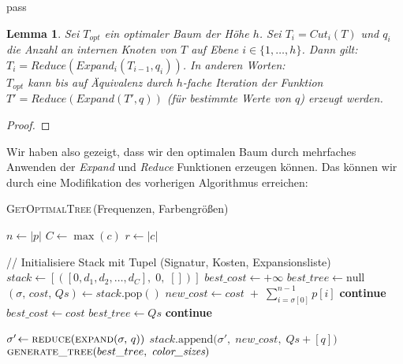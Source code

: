 pass\documentclass[a4paper,10pt,ngerman]{scrartcl}
\newtheorem{lemma}[satz]{Lemma}
\begin{document}
    \begin{lemma}
        Sei $T_{opt}$ ein optimaler Baum der Höhe $h$.
        Sei $T_i = Cut_i(T)$ und $q_i$ die Anzahl an internen Knoten von $T$ auf Ebene $i \in \{1, \dots, h\}$.
        Dann gilt: $T_i = Reduce(Expand_i(T_{i-1}, q_i))$.
        In anderen Worten: \\
        $T_{opt}$ kann bis auf Äquivalenz durch $h$-fache Iteration der Funktion $T' = Reduce(Expand(T',q))$ (für bestimmte Werte von $q$) erzeugt werden.
    \end{lemma}
    \begin{proof}

    \end{proof}
    Wir haben also gezeigt, dass wir den optimalen Baum durch mehrfaches Anwenden der \textit{Expand} und \textit{Reduce} Funktionen erzeugen können.
    Das können wir durch eine Modifikation des vorherigen Algorithmus erreichen:
    \begin{algorithm} [H]
        \caption{\textsc{GetOptimalTree}\,(Frequenzen, Farbengrößen)}
        \begin{algorithmic}[1]
                \State $n \gets |p|$  
                \State $C \gets \max(c)$ 
                \State $r \gets |c|$  

                \State // Initialisiere Stack mit Tupel (Signatur, Kosten, Expansionsliste)
                \State $stack \gets [([0, d_1, d_2, \dots, d_C],\;0,\;[])]$
                \State $best\_cost \gets +\infty$
                \State $best\_tree \gets \text{null}$
                    \State $(\sigma,\,cost,\,Qs) \gets stack.\mathrm{pop}()$
                    \State $new\_cost \gets cost \;+\;\sum_{i=\sigma[0]}^{n-1} p[i]$
                        \State \textbf{continue}
                    \EndIf
                            \State $best\_cost \gets cost$
                            \State $best\_tree \gets Qs$
                        \EndIf
                        \State \textbf{continue}
                    \EndIf

                        \State $\sigma'\!\gets \textsc{reduce}(\textsc{expand}(\sigma,\,q))$
                        \State $stack.\mathrm{append}\bigl(\sigma',\;new\_cost,\;Qs + [q]\bigr)$
                    \EndFor
                \EndWhile
                \State \Return $\textsc{generate\_tree}(best\_tree,\;\textit{color\_sizes})$
            \EndFunction
        \end{algorithmic}\label{alg:algorithm}
    \end{algorithm}
\end{document}
